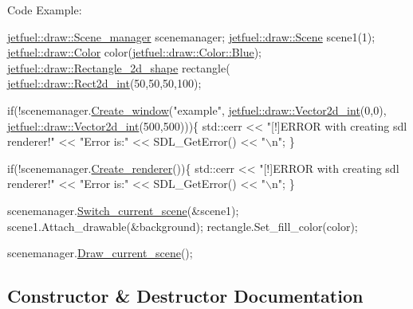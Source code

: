 Code Example\+: 
\begin{DoxyCode}
\hyperlink{classjetfuel_1_1draw_1_1Scene__manager}{jetfuel::draw::Scene\_manager} scenemanager;
\hyperlink{classjetfuel_1_1draw_1_1Scene}{jetfuel::draw::Scene} scene1(1);
\hyperlink{classjetfuel_1_1draw_1_1Color}{jetfuel::draw::Color} color(\hyperlink{classjetfuel_1_1draw_1_1Color_a6a9b5ba6b4999d1659b7186fa239f249}{jetfuel::draw::Color::Blue});
\hyperlink{classjetfuel_1_1draw_1_1Rectangle__2d__shape}{jetfuel::draw::Rectangle\_2d\_shape} rectangle(
 \hyperlink{classjetfuel_1_1draw_1_1Rect2d}{jetfuel::draw::Rect2d\_int}(50,50,50,100);

\textcolor{keywordflow}{if}(!scenemanager.\hyperlink{classjetfuel_1_1draw_1_1Scene__manager_a5113e9062c272a22d383ba872417ba31}{Create\_window}(\textcolor{stringliteral}{"example"},
                         \hyperlink{classjetfuel_1_1draw_1_1Vector2d}{jetfuel::draw::Vector2d\_int}(0,0),
                         \hyperlink{classjetfuel_1_1draw_1_1Vector2d}{jetfuel::draw::Vector2d\_int}(500,500)))\{
   std::cerr << \textcolor{stringliteral}{"[!]ERROR with creating sdl renderer!"} <<
   \textcolor{stringliteral}{"Error is:"} << SDL\_GetError() << \textcolor{stringliteral}{"\(\backslash\)n"};
\}

\textcolor{keywordflow}{if}(!scenemanager.\hyperlink{classjetfuel_1_1draw_1_1Scene__manager_afafecd926ce5e4b2543a6d583a7d24b6}{Create\_renderer}())\{
     std::cerr << \textcolor{stringliteral}{"[!]ERROR with creating sdl renderer!"} <<
    \textcolor{stringliteral}{"Error is:"} << SDL\_GetError() << \textcolor{stringliteral}{"\(\backslash\)n"};
\}

scenemanager.\hyperlink{classjetfuel_1_1draw_1_1Scene__manager_a770c163b88ba8427539ee182315ea989}{Switch\_current\_scene}(&scene1);
scene1.Attach\_drawable(&background);
rectangle.Set\_fill\_color(color);

scenemanager.\hyperlink{classjetfuel_1_1draw_1_1Scene__manager_a8af9a3abfd5121b1b8556342de435773}{Draw\_current\_scene}();
\end{DoxyCode}
 

\subsection{Constructor \& Destructor Documentation}
\mbox{\label{classjetfuel_1_1draw_1_1Color_a0deb50ab0c45f96bf039d595fda8d6c3}} 
